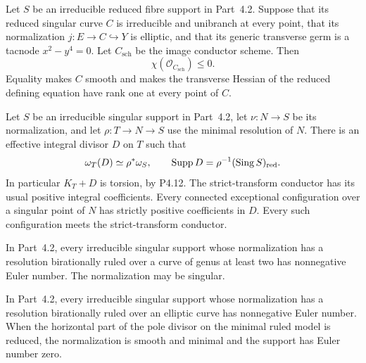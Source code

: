 \begin{proposition}[P4R.10]\hypertarget{tag-02Y3}{}\label{night:P4R.10}\label{stmt:P4R.10}


Let $S$ be an irreducible reduced fibre support in Part~4.2.
Suppose that its reduced singular curve $C$ is irreducible and
unibranch at every point, that its normalization $j:E\to C\hookrightarrow Y$
is elliptic, and that its generic transverse germ is a tacnode
$x^2-y^4=0$. Let $C_{\mathrm{sch}}$ be the image conductor scheme.
Then
\[
 \chi(\mathcal O_{C_{\mathrm{sch}}})\leq0.
\]
Equality makes $C$ smooth and makes the transverse Hessian of
the reduced defining equation have rank one at every point of $C$.
\end{proposition}

\begin{proposition}[P4R.6]\hypertarget{tag-02YI}{}\label{night:P4R.6}\label{stmt:P4R.6}


Let $S$ be an irreducible singular support in
Part~4.2, let $\nu:N\to S$ be its normalization,
and let $\rho:T\to N\to S$ use the minimal
resolution of $N$. There is an effective integral
divisor $D$ on $T$ such that
\[
 \omega_T(D)\simeq\rho^*\omega_S,
 \qquad \operatorname{Supp}D
       =\rho^{-1}(\operatorname{Sing}S)_{\rm red}.
\]
In particular $K_T+D$ is torsion, by P4.12.
The strict-transform conductor has its usual
positive integral coefficients. Every connected
exceptional configuration over a singular point
of $N$ has strictly positive coefficients in $D$.
Every such configuration meets the strict-transform
conductor.
\end{proposition}

\begin{proposition}[P4R.7]\hypertarget{tag-02YJ}{}\label{night:P4R.7}\label{stmt:P4R.7}


In Part~4.2, every irreducible singular
support whose normalization has a
resolution birationally ruled over a
curve of genus at least two has
nonnegative Euler number. The
normalization may be singular.
\end{proposition}

\begin{proposition}[P4R.9]\hypertarget{tag-02YL}{}\label{night:P4R.9}\label{stmt:P4R.9}


In Part~4.2, every irreducible singular
support whose normalization has a
resolution birationally ruled over an
elliptic curve has nonnegative Euler
number. When the horizontal part of
the pole divisor on the minimal ruled
model is reduced, the normalization
is smooth and minimal and the support
has Euler number zero.
\end{proposition}

